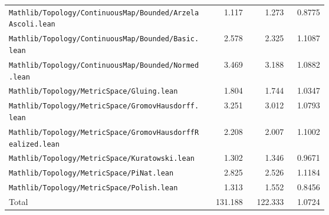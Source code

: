 {\begin{longtable}{p{0.63\linewidth}rrr}
\nolinkurl{Mathlib/Topology/ContinuousMap/Bounded/ArzelaAscoli.lean} & 1.117 & 1.273 & 0.8775\\
\nolinkurl{Mathlib/Topology/ContinuousMap/Bounded/Basic.lean} & 2.578 & 2.325 & 1.1087\\
\nolinkurl{Mathlib/Topology/ContinuousMap/Bounded/Normed.lean} & 3.469 & 3.188 & 1.0882\\
\nolinkurl{Mathlib/Topology/MetricSpace/Gluing.lean} & 1.804 & 1.744 & 1.0347\\
\nolinkurl{Mathlib/Topology/MetricSpace/GromovHausdorff.lean} & 3.251 & 3.012 & 1.0793\\
\nolinkurl{Mathlib/Topology/MetricSpace/GromovHausdorffRealized.lean} & 2.208 & 2.007 & 1.1002\\
\nolinkurl{Mathlib/Topology/MetricSpace/Kuratowski.lean} & 1.302 & 1.346 & 0.9671\\
\nolinkurl{Mathlib/Topology/MetricSpace/PiNat.lean} & 2.825 & 2.526 & 1.1184\\
\nolinkurl{Mathlib/Topology/MetricSpace/Polish.lean} & 1.313 & 1.552 & 0.8456\\
Total & 131.188 & 122.333 & 1.0724\\
\bottomrule\end{longtable}}
